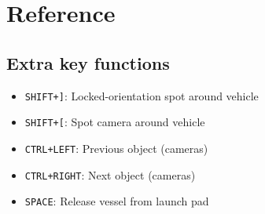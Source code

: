 \documentclass{article}
\newcommand{\reg}[1]{\texttt{#1}}
\begin{document}
\section{Reference}
\subsection{Extra key functions}
\begin{itemize}
  \item \reg{SHIFT+]}: Locked-orientation spot around vehicle
  \item \reg{SHIFT+[}: Spot camera around vehicle
  \item \reg{CTRL+LEFT}: Previous object (cameras)
  \item \reg{CTRL+RIGHT}: Next object (cameras)
  \item \reg{SPACE}: Release vessel from launch pad
\end{itemize}

\end{document}
